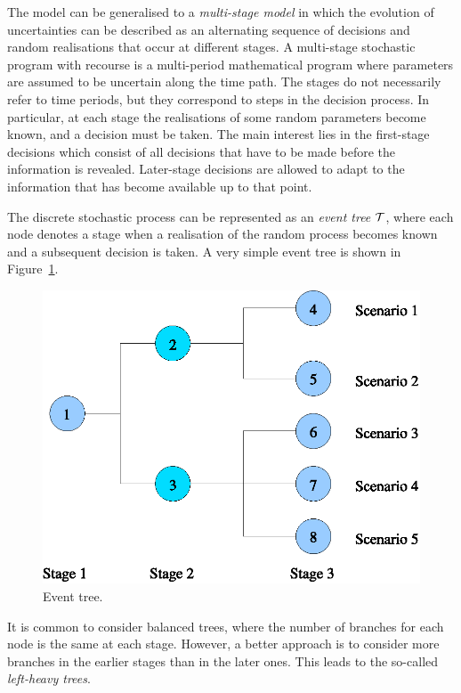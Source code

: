 The model can be generalised to a {\em multi-stage model} in which 
the evolution of uncertainties can be 
described as an alternating sequence of decisions and random 
realisations that occur at different stages.
A multi-stage stochastic program with recourse is a multi-period 
mathematical program where parameters are assumed to be uncertain 
along the time path.
The stages do not necessarily refer to time periods, but they correspond
to steps in the decision process. In particular, at each stage the
realisations of some random parameters become known, and a decision
must be taken.
The main interest lies in the 
first-stage decisions which consist of all decisions that have to
be made before the information is revealed. Later-stage decisions 
are allowed to adapt to the information that has become available 
up to that point.

The discrete stochastic process can be represented as an 
{\em event tree} $\mathcal{T}$,
where each node denotes a stage when a realisation 
of the random process becomes known and a subsequent decision is taken.
A very simple event tree is shown in Figure~\ref{fig:EventTree}.
%
\begin{figure}[ht]
  \begin{center}
    \includegraphics[scale=0.6]{figures/tree.eps}
    \caption{Event tree.}
    \label{fig:EventTree}
  \end{center}
  \vspace{-3ex}
\end{figure}
%
It is common to consider balanced trees, where the number of
branches for each node is the same at each stage.
However, a better approach is to consider more branches in the
earlier stages than in the later ones. This leads to the
so-called {\em left-heavy trees}.

